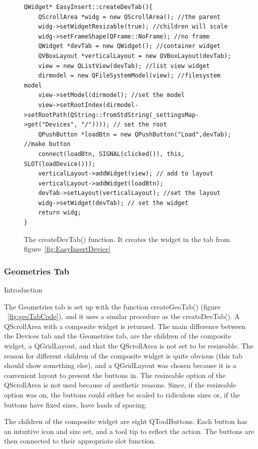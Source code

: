 \begin{figure}[h] %
\centering
\lstset{language=C++} 
\begin{lstlisting}[frame=single]  
QWidget* EasyInsert::createDevTab(){
	QScrollArea *widg = new QScrollArea(); //the parent 
	widg->setWidgetResizable(true); //children will scale 
	widg->setFrameShape(QFrame::NoFrame); //no frame 
	QWidget *devTab = new QWidget(); //container widget
	QVBoxLayout *verticalLayout = new QVBoxLayout(devTab); 
	view = new QListView(devTab); //list view widget
	dirmodel = new QFileSystemModel(view); //filesystem model
	view->setModel(dirmodel); //set the model
	view->setRootIndex(dirmodel->setRootPath(QString::fromStdString(_settingsMap->get("Devices", "/")))); // set the root
	QPushButton *loadBtn = new QPushButton("Load",devTab); //make button
	connect(loadBtn, SIGNAL(clicked()), this, SLOT(loadDevice())); 
	verticalLayout->addWidget(view); // add to layout
	verticalLayout->addWidget(loadBtn);
	devTab->setLayout(verticalLayout); //set the layout
	widg->setWidget(devTab); // set the widget
	return widg;
}
\end{lstlisting}
\caption{The createDevTab() function. It creates the widget in the tab from figure~\ref{fig:EasyInsertDevice}}
\label{fig:deviceTabCode} 	
\end{figure}

\subsubsection{Geometries Tab}
\label{sec:GeoTab}

Introduction

The Geometries tab is set up with the function createGeoTab() (figure ~\ref{fig:geoTabCode}), and it uses a similar procedure as the createDevTab(). A QScrollArea with a composite widget is returned. The main difference between the Devices tab and the Geometries tab, are the children of the composite widget, a QGridLayout, and that the QScrollArea is not set to be resizeable. The reason for different children of the composite widget is quite obvious (this tab should show something else), and a QGridLayout was chosen because it is a convenient layout to present the buttons in. The resizeable option of the QScrollArea is not used because of aesthetic reasons. Since, if the resizeable option was on, the buttons could either be scaled to ridiculous sizes or, if the buttons have fixed sizes, have loads of spacing. 

The children of the composite widget are eight QToolButtons. Each button has an intuitive icon and size set, and a tool tip to reflect the action. The buttons are then connected to their appropriate slot function.    

